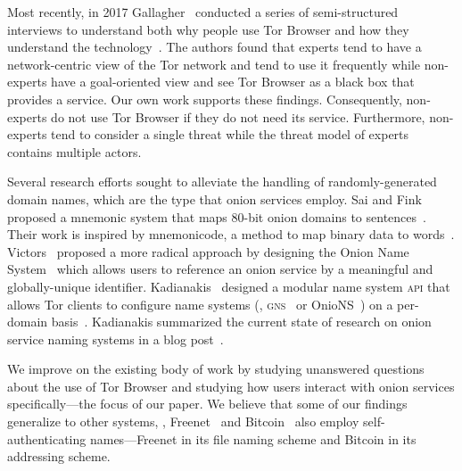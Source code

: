 Most recently, in 2017 Gallagher \ea\ conducted a series of semi-structured
interviews to understand both why people use Tor Browser and how they understand
the technology~\cite{Gallagher2017a}.  The authors found that experts tend to
have a network-centric view of the Tor network and tend to use it frequently
while non-experts have a goal-oriented view and see Tor Browser as a black box
that provides a service.  Our own work supports these findings.  Consequently,
non-experts do not use Tor Browser if they do not need its service.
Furthermore, non-experts tend to consider a single threat while the threat model
of experts contains multiple actors.

Several research efforts sought to alleviate the handling of randomly-generated
domain names, which are the type that onion services employ.
Sai and Fink proposed a mnemonic system that maps 80-bit onion
domains to sentences~\cite{Sai2012a}.  Their work is inspired by mnemonicode, a
method to map binary data to words~\cite{mnemonicode}.  Victors \ea\ proposed a
more radical approach by designing the Onion Name System~\cite{Victors2017a}
which allows users to reference an onion service by a meaningful and
globally-unique identifier.  Kadianakis \ea\ designed a modular name system
\textsc{api} that allows Tor clients to configure name systems (\eg,
\textsc{gns}~\cite{Schanzenbach2012a} or OnioNS~\cite{Victors2017a}) on a
per-domain basis~\cite{Kadianakis2016a}.  Kadianakis summarized the current
state of research on onion service naming systems in a blog
post~\cite{Kadianakis2017a}.

We improve on the existing body of work by studying unanswered questions about
the use of Tor Browser and studying how users interact with onion services specifically---the focus of our paper. 
We believe that some of our findings generalize to other
systems, \eg, Freenet~\cite{Freenet} and Bitcoin~\cite{Nakamoto2008a} also
employ self-authenticating names---Freenet in its file naming scheme and Bitcoin
in its addressing scheme.
